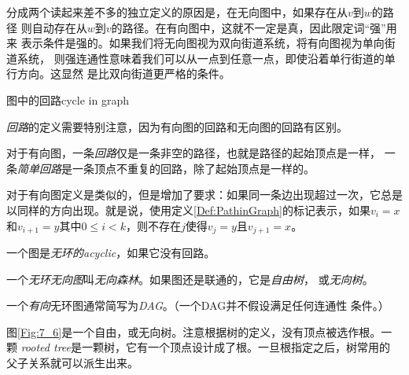 分成两个读起来差不多的独立定义的原因是，在无向图中，如果存在从$v$到$w$的路径
则自动存在从$w$到$v$的路径。在有向图中，这就不一定是真，因此限定词“强”用来
表示条件是强的。如果我们将无向图视为双向街道系统，将有向图视为单向街道系统，
则强连通性意味着我们可以从一点到任意一点，即使沿着单行街道的单行方向。这显然
是比双向街道更严格的条件。

\begin{definition}
图中的回路cycle in graph

\emph{回路}的定义需要特别注意，因为有向图的回路和无向图的回路有区别。

对于有向图，一条\emph{回路}仅是一条非空的路径，也就是路径的起始顶点是一样，
一条\emph{简单回路}是一条顶点不重复的回路，除了起始顶点是一样的。

对于有向图定义是类似的，但是增加了要求：如果同一条边出现超过一次，它总是
以同样的方向出现。就是说，使用定义\ref{Def:PathinGraph}的标记表示，如果$v_i=x$
和$v_{i+1}=y$其中$0\leq i <k$，则不存在$j$使得$v_j=y$且$v_{j+1}=x$。

一个图是\emph{无环的acyclic}，如果它没有回路。

一个\emph{无环无向图}叫\emph{无向森林}。如果图还是联通的，它是\emph{自由树}，
或\emph{无向树}。

一个\emph{有向}无环图通常简写为\emph{DAG}。（一个DAG并不假设满足任何连通性
条件。）
\end{definition}

\begin{figure*}[!t]
    \centering
    \caption{自由树，表示酒精的分子式}
    \label{Fig:7_6}
\end{figure*}

图\ref{Fig:7_6}是一个自由，或无向树。注意根据树的定义，没有顶点被选作根。一颗
\emph{rooted tree}是一颗树，它有一个顶点设计成了根。一旦根指定之后，树常用的
父子关系就可以派生出来。

